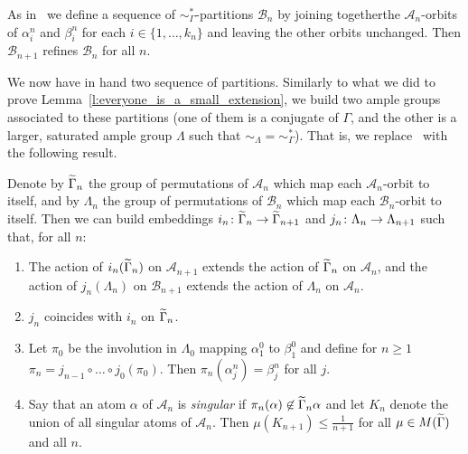 \documentclass[AHL,Unicode]{cedram}
\newcommand{\mcA}{\mathcal{A}}
\newcommand{\mcB}{\mathcal{B}}
\let\oldtilde\tilde
\renewcommand*{\tilde}[1]{\mathchoice{\widetilde{#1}}{\widetilde{#1}}{\oldtilde{#1}}{\oldtilde{#1}}}
\renewcommand*{\to}{\mathchoice{\longrightarrow}{\rightarrow}{\rightarrow}{\rightarrow}}
\begin{document}
As in~\cite{Melleray2023} we define a sequence of $\sim_\Gamma^*$-partitions $\mcB_n$ by joining together\linebreak the $\mcA_n$-orbits of $\alpha_i^n$ and $\beta_i^n$ for each $i \in \{1,\dots,k_n\}$ and leaving the other orbits unchanged. Then $\mcB_{n+1}$ refines $\mcB_n$ for all $n$.

We now have in hand two sequence of partitions. Similarly to what we did to prove Lemma~\ref{l:everyone_is_a_small_extension}, we build two ample groups associated to these partitions (one of them is a conjugate of $\Gamma$, and the other is a larger, saturated ample group $\Lambda$ such that $\sim_{\Lambda}=\sim_{\Gamma}^*$). That is, we replace~\cite[Lemma~5.4]{Melleray2023} with the following result.

\begin{lemm}
Denote by $\tilde \Gamma_n$ the group of permutations of $\mcA_n$ which map each $\mcA_n$-orbit to itself, and by $\Lambda_n$ the group of permutations of $\mcB_n$ which map each $\mcB_n$-orbit to itself. Then we can build embeddings $i_n \colon \tilde \Gamma_n \to \tilde \Gamma_{n+1}$ and $j_n \colon \Lambda_n \to \Lambda_{n+1}$ such that, for all $n$:
\begin{enumerate}
\item The action of $i_n(\tilde \Gamma_n)$ on $\mcA_{n+1}$ extends the action of $\tilde \Gamma_n$ on $\mcA_n$, and the action of $j_n(\Lambda_n)$ on $\mcB_{n+1}$ extends the action of $\Lambda_n$ on $\mcA_n$.
\item $j_n$ coincides with $i_n$ on $\tilde \Gamma_n$.
\item Let $\pi_0$ be the involution in $\Lambda_0$ mapping $\alpha_1^0$ to $\beta_1^0$ and define for $n \ge 1$ $\pi_n=j_{n-1} \circ \dots \circ j_0(\pi_0)$. Then $\pi_n(\alpha_j^n)=\beta_j^n$ for all $j$.
\item Say that an atom $\alpha$ of $\mcA_n$ is \emph{singular} if $\pi_n(\alpha) \not \in \tilde \Gamma_n \alpha$ and let $K_n$ denote the union of all singular atoms of $\mcA_n$. Then $\mu(K_{n+1}) \le \frac{1}{n+1}$ for all $\mu \in M(\tilde \Gamma)$ and all $n$.
\end{enumerate}
\end{lemm}
\end{document}
